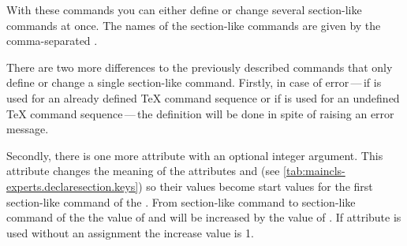 \begin{Declaration}
\end{Declaration}
With these commands you can either define or change several
section-like commands at once. The names of the section-like commands are
given by the comma-separated .

There are two more differences to the previously described commands that only
define or change a single section-like command. Firstly, in case of error\,---\,if  is used for an already defined \TeX{}
command sequence or if  is used for an
undefined \TeX{} command sequence\,---\,the definition will be done in spite
of raising an error message.

Secondly, there is one more attribute  with an optional
integer argument. This attribute changes the meaning of the attributes
 and  (see
\autoref{tab:maincls-experts.declaresection.keys}) so their values become
start values for the first section-like command of the . From section-like command to section-like command of the  the value of  and 
will be increased by the value of . If attribute
 is used without an assignment the increase value is 1.
%
\EndIndexGroup


